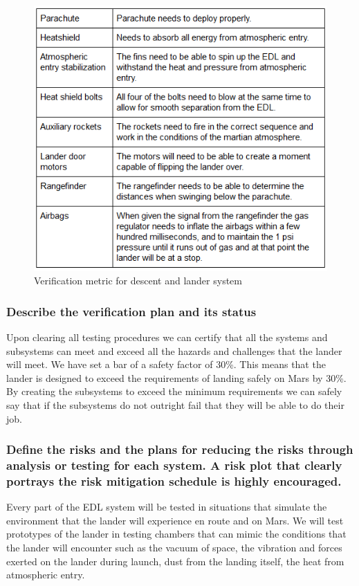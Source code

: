 \documentclass[%
 portrait,
 aapm,
 mph,%
 amsmath,amssymb,
 reprint,%
]{revtex4-2}
\begin{document}
\begin{figure}
  \includegraphics[width=\textwidth]{DescentandLanding/4_1_5.png}
   \caption{Verification metric for descent and lander system}
\end{figure} 

\subsubsection{Describe the verification plan and its status}
Upon clearing all testing procedures we can certify that all the systems and subsystems can meet and exceed all the hazards and challenges that the lander will meet.  We have set a bar of a safety factor of 30\%. This means that the lander is designed to exceed the requirements of landing safely on Mars by 30\%. By creating the subsystems to exceed the minimum requirements we can safely say that if the subsystems do not outright fail that they will be able to do their job.

\subsubsection{Define the risks and the plans for reducing the risks through analysis or
testing for each system. A risk plot that clearly portrays the risk
mitigation schedule is highly encouraged.}
Every part of the EDL system will be tested in situations that simulate the environment that the lander will experience en route and on Mars.  We will test prototypes of the lander in testing chambers that can mimic the conditions that the lander will encounter such as the vacuum of space, the vibration and forces exerted on the lander during launch, dust from the landing itself, the heat from atmospheric entry.  
\end{document}
